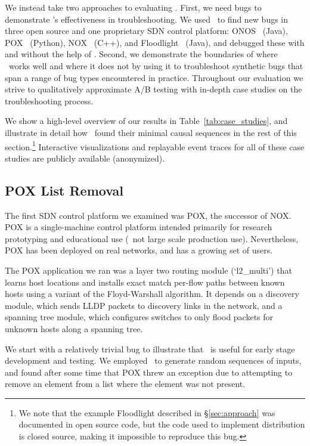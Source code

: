 We instead take two approaches to evaluating \simulator.
First, we need bugs to demonstrate \simulator's effectiveness in
troubleshooting. We used \projectname~to find new bugs in three open source and one proprietary SDN control platform:
ONOS~\cite{ONOS} (Java), POX~\cite{pox} (Python), NOX~\cite{nox} (C++), and
Floodlight~\cite{bigswitch} (Java), and debugged these with and
without the help of \simulator. Second, we demonstrate the
boundaries of where \simulator~works well and where it does not by using it to
troubleshoot synthetic bugs that span a range of bug types encountered in
practice. Throughout our evaluation we strive to qualitatively approximate A/B testing
with in-depth case studies on the troubleshooting process.

We show a high-level overview
of our results in Table~\ref{tab:case_studies}, and
illustrate in detail how \simulator~found their minimal causal sequences
in the rest of this section.\footnote{We note that the example Floodlight
described in \S\ref{sec:approach} was documented in open source code, but
the code used to implement distribution is closed source, making it impossible
to reproduce this bug.} Interactive visualizations and replayable event traces
for all of these case studies are publicly available (anonymized).


\subsection{POX List Removal}
The first SDN control platform we examined was POX, the successor of NOX. POX is
a single-machine control platform intended primarily for research prototyping
and educational use (\ie~not large scale production use). Nevertheless, POX has
been deployed on real networks, and has a growing set of users.

The POX application we ran was a layer two routing module (`l2\_multi') that
learns host locations and installs exact match per-flow paths between known hosts using a variant of the
Floyd-Warshall algorithm. It depends on a discovery module, which sends
LLDP packets to discovery links in the network, and a spanning tree module,
which configures switches to only flood packets for unknown hosts along a
spanning tree.

We start with a relatively trivial bug to illustrate that
\projectname~is useful for early stage development and testing.
We employed \projectname~to generate random sequences of
inputs, and found after some time that POX threw an exception due to
attempting to remove an element from a list where the element was not present.

